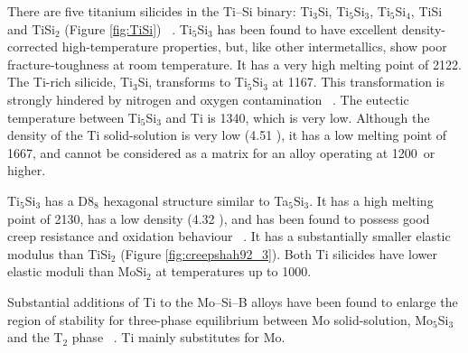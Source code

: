 There are five titanium silicides in the Ti--Si binary: Ti$_3$Si, Ti$_5$Si$_3$, Ti$_5$Si$_4$, TiSi and TiSi$_2$ (Figure \ref{fig:TiSi}) ~\cite{seifert96}.   Ti$_5$Si$_3$ has been found to have excellent density-corrected high-temperature properties, but, like other intermetallics, show poor fracture-toughness at room temperature.  It has a very high melting point of 2122\celsius.  The Ti-rich silicide, Ti$_3$Si, transforms to Ti$_5$Si$_3$ at 1167\celsius.  This transformation is strongly hindered by nitrogen and oxygen contamination ~\cite{costa10}.  The eutectic temperature between Ti$_5$Si$_3$ and Ti is 1340\celsius, which is very low. Although the density of the Ti solid-solution is very low (4.51 \gram\usk\centi\rpcubic\meter), it has a low melting point of 1667\celsius, and cannot be considered as a matrix for an alloy operating at 1200\celsius\ or higher. 

Ti$_5$Si$_3$ has a D8$_8$ hexagonal structure similar to Ta$_5$Si$_3$.  It has a high melting point of 2130\celsius, has a low density (4.32 \gram\usk\centi\rpcubic\meter), and has been found to possess good creep resistance and oxidation behaviour ~\cite{zhan09}.  It has a substantially smaller elastic modulus than TiSi$_2$ (Figure \ref{fig:creepshah92_3}).  Both Ti silicides have lower elastic moduli than MoSi$_2$ at temperatures up to 1000\celsius.

Substantial additions of Ti to the Mo--Si--B alloys have been found to enlarge the region of stability for three-phase equilibrium between Mo solid-solution, Mo$_5$Si$_3$ and the T$_2$ phase ~\cite{yang10}.  Ti mainly substitutes for Mo.

